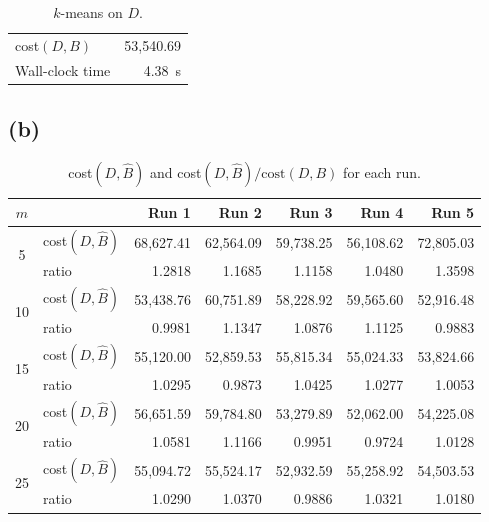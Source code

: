 \documentclass[11pt,a4paper]{article}
\newcommand{\timeA}{4.38}          %
\begin{document}
\begin{table}[H]
\centering
\begin{tabular}{lr}
\toprule
cost$(D,B)$ & 53{,}540.69 \\
Wall-clock time & \timeA\ s \\
\bottomrule
\end{tabular}
\caption{$k$-means on $D$.}
\end{table}

\subsection*{(b)}

\begin{table}[H]
\centering
\small
\begin{tabular}{clrrrrr}
\toprule
$m$ & & Run 1 & Run 2 & Run 3 & Run 4 & Run 5 \\
\midrule
\multirow{2}{*}{5}  & cost$(D,\hat B)$ & 68{,}627.41 & 62{,}564.09 & 59{,}738.25 & 56{,}108.62 & 72{,}805.03 \\
                    & ratio            & 1.2818 & 1.1685 & 1.1158 & 1.0480 & 1.3598 \\
\midrule
\multirow{2}{*}{10} & cost$(D,\hat B)$ & 53{,}438.76 & 60{,}751.89 & 58{,}228.92 & 59{,}565.60 & 52{,}916.48 \\
                    & ratio            & 0.9981 & 1.1347 & 1.0876 & 1.1125 & 0.9883 \\
\midrule
\multirow{2}{*}{15} & cost$(D,\hat B)$ & 55{,}120.00 & 52{,}859.53 & 55{,}815.34 & 55{,}024.33 & 53{,}824.66 \\
                    & ratio            & 1.0295 & 0.9873 & 1.0425 & 1.0277 & 1.0053 \\
\midrule
\multirow{2}{*}{20} & cost$(D,\hat B)$ & 56{,}651.59 & 59{,}784.80 & 53{,}279.89 & 52{,}062.00 & 54{,}225.08 \\
                    & ratio            & 1.0581 & 1.1166 & 0.9951 & 0.9724 & 1.0128 \\
\midrule
\multirow{2}{*}{25} & cost$(D,\hat B)$ & 55{,}094.72 & 55{,}524.17 & 52{,}932.59 & 55{,}258.92 & 54{,}503.53 \\
                    & ratio            & 1.0290 & 1.0370 & 0.9886 & 1.0321 & 1.0180 \\
\bottomrule
\end{tabular}
\caption{cost$(D,\hat B)$ and cost$(D,\hat B)/\text{cost}(D,B)$ for each run.}
\end{table}
\end{document}
